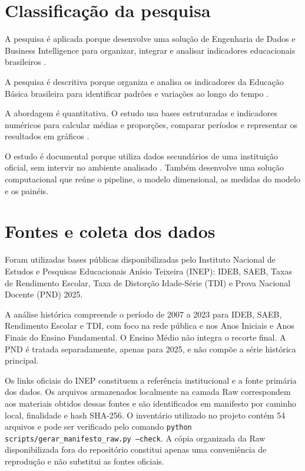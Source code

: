 \section{Classificação da pesquisa}

A pesquisa é aplicada porque desenvolve uma solução de Engenharia de Dados e Business Intelligence para organizar, integrar e analisar indicadores educacionais brasileiros \cite{prodanov2013}.

A pesquisa é descritiva porque organiza e analisa os indicadores da Educação Básica brasileira para identificar padrões e variações ao longo do tempo \cite{gil2002}.

A abordagem é quantitativa. O estudo usa bases estruturadas e indicadores numéricos para calcular médias e proporções, comparar períodos e representar os resultados em gráficos \cite{prodanov2013}.

O estudo é documental porque utiliza dados secundários de uma instituição oficial, sem intervir no ambiente analisado \cite{gil2002}. Também desenvolve uma solução computacional que reúne o pipeline, o modelo dimensional, as medidas do modelo e os painéis.

\section{Fontes e coleta dos dados}

Foram utilizadas bases públicas disponibilizadas pelo Instituto Nacional de Estudos e Pesquisas Educacionais Anísio Teixeira (INEP): IDEB, SAEB, Taxas de Rendimento Escolar, Taxa de Distorção Idade-Série (TDI) e Prova Nacional Docente (PND) 2025.

A análise histórica compreende o período de 2007 a 2023 para IDEB, SAEB, Rendimento Escolar e TDI, com foco na rede pública e nos Anos Iniciais e Anos Finais do Ensino Fundamental. O Ensino Médio não integra o recorte final. A PND é tratada separadamente, apenas para 2025, e não compõe a série histórica principal.

Os links oficiais do INEP constituem a referência institucional e a fonte primária dos dados. Os arquivos armazenados localmente na camada Raw correspondem aos materiais obtidos dessas fontes e são identificados em manifesto por caminho local, finalidade e hash SHA-256. O inventário utilizado no projeto contém 54 arquivos e pode ser verificado pelo comando \texttt{python scripts/gerar\_manifesto\_raw.py --check}. A cópia organizada da Raw disponibilizada fora do repositório constitui apenas uma conveniência de reprodução e não substitui as fontes oficiais.

